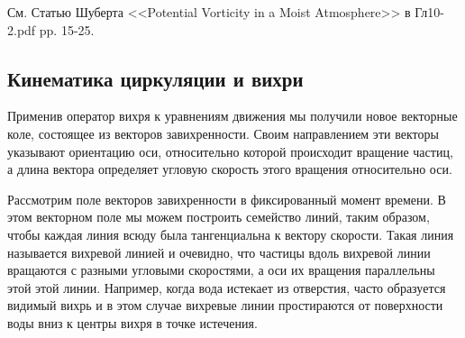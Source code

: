 \begin{warn}
    См. Статью Шуберта <<Potential Vorticity in a Moist Atmosphere>> в Гл10-2.pdf pp. 15-25.
\end{warn}

\subsection{{\color{done}Кинематика циркуляции и вихри}}
Применив оператор вихря к уравнениям движения мы получили новое векторные коле, состоящее из векторов завихренности. Своим направлением эти векторы указывают ориентацию оси, относительно которой происходит вращение частиц, а длина вектора определяет угловую скорость этого вращения относительно оси. 

Рассмотрим поле векторов завихренности в фиксированный момент времени. В этом векторном поле мы можем построить семейство линий, таким образом, чтобы каждая линия всюду была тангенциальна к вектору скорости. Такая линия называется вихревой линией и очевидно, что частицы вдоль вихревой линии вращаются с разными угловыми скоростями, а оси их вращения параллельны этой этой линии.  Например, когда вода истекает из отверстия, часто образуется видимый вихрь и в этом случае вихревые линии простираются от поверхности воды вниз к центры вихря в точке истечения. 

